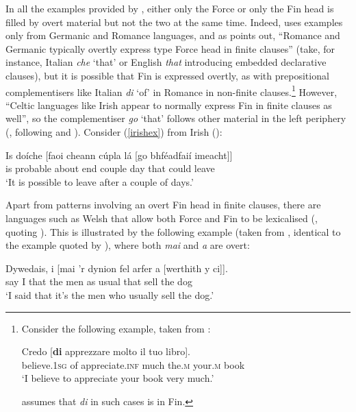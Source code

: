 In all the examples provided by \citet{rizzi1997}, either only the Force or only the Fin head is filled by overt material but not the two at the same time. Indeed, \citet{rizzi1997} uses examples only from Germanic and Romance languages, and as \citet[237]{rizzi2004} points out, ``Romance and Germanic typically overtly express type Force head in finite clauses'' (take, for instance, Italian \textit{che} `that' or English \textit{that} introducing embedded declarative clauses), but it is possible that Fin is expressed overtly, as with prepositional complementisers like Italian \textit{di} `of' in Romance in non-finite clauses.\footnote{Consider the following example, taken from \citet[288, ex. 10b]{rizzi1997}:

\ea \gll Credo [\textbf{di} apprezzare molto il tuo libro].\\
believe.\textsc{1sg} \phantom{[}of appreciate.\textsc{inf} much the.\textsc{m} your.\textsc{m} book\\
\glt `I believe to appreciate your book very much.'
\z

\citet{rizzi1997} assumes that \textit{di} in such cases is in Fin.} However, ``Celtic languages like Irish appear to normally express Fin in finite clauses as well'', so the complementiser \textit{go} `that' follows other material in the left periphery (\citealt[237]{rizzi2004}, following \citealt{mccloskey1996} and \citealt{roberts2004}). Consider (\ref{irishex}) from Irish (\citealt[237, ex. 45]{rizzi2004}):

\ea \gll Is do\'iche [faoi cheann c\'upla l\'a [go bhf\'eadfai\'i imeacht]] \label{irishex}\\
is probable \phantom{[}about end couple day \phantom{[}that could leave\\
\glt `It is possible to leave after a couple of days.'
\z

Apart from patterns involving an overt Fin head in finite clauses, there are languages such as Welsh that allow both Force and Fin to be lexicalised (\citealt[237]{rizzi1997}, quoting \citealt{roberts2004}). This is illustrated by the following example (taken from \citealt[122, ex. 8]{roberts2005}, identical to the example quoted by \citealt[237]{rizzi1997}), where both \textit{mai} and \textit{a} are overt:

\ea \gll Dywedais, i [mai 'r dynion fel arfer a [werthith y ci]]. \label{welsh}\\
say I \phantom{[}that the men as usual that \phantom{[}sell the dog\\
\glt `I said that it’s the men who usually sell the dog.'
\z

